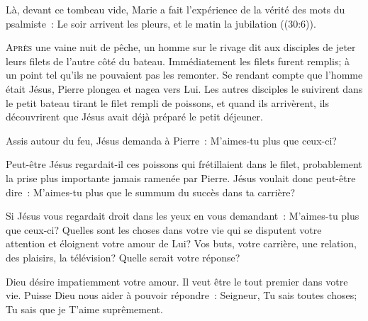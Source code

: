 Là, devant ce tombeau vide, Marie a fait l'expérience de la vérité
 des mots du psalmiste~:
 \og Le soir arrivent les pleurs, et le matin la jubilation \fg{}
 ((30:6)).

\dvrule






\lettrine{A}{près} une vaine nuit de pêche,
 un homme sur le rivage dit aux disciples de jeter leurs filets
 de l'autre côté du bateau. Immédiatement les filets furent remplis;
 à un point tel qu'ils ne pouvaient pas les remonter.
 Se rendant compte que l'homme était Jésus, Pierre plongea et nagea vers Lui.
 Les autres disciples le suivirent dans le petit bateau
 tirant le filet rempli de poissons, et quand ils arrivèrent,
 ils découvrirent que Jésus avait déjà préparé le petit déjeuner.

Assis autour du feu, Jésus demanda à Pierre~: 
 \og M'aimes-tu plus que ceux-ci? \fg{}


Peut-être Jésus regardait-il ces poissons qui frétillaient dans le filet,
 probablement la prise plus importante jamais ramenée par Pierre.
 Jésus voulait donc peut-être dire~: 
 \og M'aimes-tu plus que le summum du succès dans ta carrière? \fg{}

Si Jésus vous regardait droit dans les yeux en vous demandant~:
 \og M'aimes-tu plus que ceux-ci? \fg{} 
 Quelles sont les choses dans votre vie qui se disputent votre attention
 et éloignent votre amour de Lui? Vos buts, votre carrière, une relation,
 des plaisirs, la télévision? Quelle serait votre réponse?

Dieu désire impatiemment votre amour. Il veut être le tout premier
 dans votre vie. Puisse Dieu nous aider à pouvoir répondre~: 
 \og Seigneur, Tu sais toutes choses; Tu sais que je T'aime suprêmement. \fg{}

\dvrule




